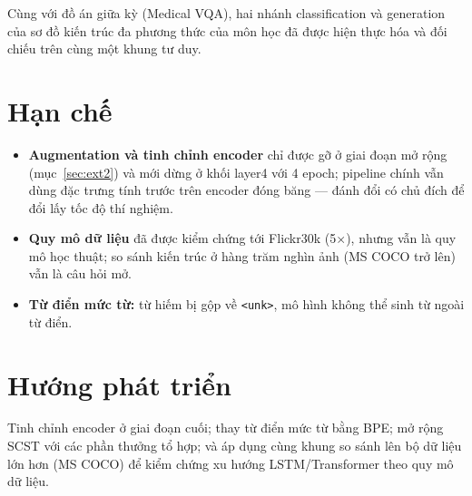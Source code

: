 Cùng với đồ án giữa kỳ (Medical VQA), hai nhánh classification và generation
của sơ đồ kiến trúc đa phương thức của môn học đã được hiện thực hóa và đối
chiếu trên cùng một khung tư duy.

\section{Hạn chế}

\begin{itemize}
	\item \textbf{Augmentation và tinh chỉnh encoder} chỉ được gỡ ở giai đoạn
	      mở rộng (mục~\ref{sec:ext2}) và mới dừng ở khối layer4 với 4 epoch; pipeline
	      chính vẫn dùng đặc trưng tính trước trên encoder đóng băng ---
	      đánh đổi có chủ đích để đổi lấy tốc độ thí nghiệm.
	\item \textbf{Quy mô dữ liệu} đã được kiểm chứng tới Flickr30k (5$\times$),
	      nhưng vẫn là quy mô học thuật; so sánh kiến trúc ở hàng trăm nghìn
	      ảnh (MS COCO trở lên) vẫn là câu hỏi mở.
	\item \textbf{Từ điển mức từ:} từ hiếm bị gộp về \texttt{<unk>}, mô hình
	      không thể sinh từ ngoài từ điển.
\end{itemize}

\section{Hướng phát triển}

Tinh chỉnh encoder ở giai đoạn cuối; thay từ điển mức từ bằng BPE; mở rộng SCST
với các phần thưởng tổ hợp; và áp dụng cùng khung so sánh lên bộ dữ liệu lớn hơn
(MS COCO) để kiểm chứng xu hướng LSTM/Transformer theo quy mô dữ liệu.
